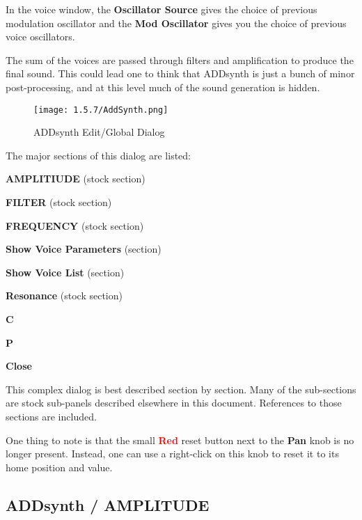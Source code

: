    In the voice window, the \textbf{Oscillator Source} gives the choice of
   previous modulation oscillator and the \textbf{Mod Oscillator} gives you the
   choice of previous voice oscillators.

   The sum of the voices are passed through filters and amplification to
   produce the final sound. This could lead one to think that ADDsynth is just
   a bunch of minor post-processing, and at this level much of the sound
   generation is hidden.

\begin{figure}[H]
   \centering 
   \texttt{[image: 1.5.7/AddSynth.png]}
   \caption{ADDsynth Edit/Global Dialog}
   \label{fig:addsynth_edit_dialog}
\end{figure}

   The major sections of this dialog are listed:

   \begin{enumber}
      \item \textbf{AMPLITIUDE} (stock section)
      \item \textbf{FILTER} (stock section)
      \item \textbf{FREQUENCY} (stock section)
      \item \textbf{Show Voice Parameters} (section)
      \item \textbf{Show Voice List} (section)
      \item \textbf{Resonance} (stock section)
      \item \textbf{C}
      \item \textbf{P}
      \item \textbf{Close}
   \end{enumber}

   This complex dialog is best described section by section.
   Many of the sub-sections are stock sub-panels described elsewhere
   in this document.  References to those sections are included.

   One thing to note is that the small \textbf{\textcolor{red}{Red}}
   reset button next to the \textbf{Pan} knob is no longer present.  Instead,
   one can use a right-click on this knob to reset it to its home position and
   value.

\subsection{ADDsynth / AMPLITUDE}
\label{subsec:addsynth_amplitude}


